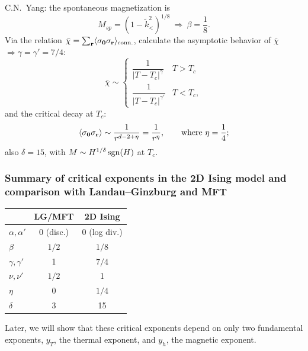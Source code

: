 C.N.~Yang: the spontaneous magnetization is
\begin{equation}
  M_{sp} = (1-\tilde k_<^2)^{1/8}\ \Rightarrow\ \beta = \frac{1}{8} .
\end{equation}
Via the relation $\bar\chi = \sum_{\mathbf r}\langle \sigma_{\mathbf 0}\sigma_{\mathbf r}\rangle_{\text{conn.}}$,
calculate the asymptotic behavior of $\bar\chi$ $\Rightarrow\gamma = \gamma' = 7/4$:
\begin{equation}
  \bar\chi\sim\begin{cases}\dfrac{1}{|T-T_c|^{\gamma}} & T>T_c\\[8pt] \dfrac{1}{|T-T_c|^{\gamma'}} & T<T_c,\end{cases}
\end{equation}
and the critical decay at $T_c$:
\begin{equation}
  \langle \sigma_{\mathbf 0}\sigma_{\mathbf r}\rangle\sim\frac{1}{r^{d-2+\eta}} = \frac{1}{r^\eta},\qquad\text{where }\eta = \frac{1}{4} ;
\end{equation}
also $\delta = 15$, with $M\sim H^{1/\delta}\operatorname{sgn}(H)$ at $T_c$.

\subsubsection*{Summary of critical exponents in the 2D Ising model and comparison with Landau--Ginzburg and MFT}

\begin{center}
\renewcommand{\arraystretch}{1.25}
\begin{tabular}{lcc}
  & LG/MFT & 2D Ising\\ \hline
  $\alpha,\alpha'$ & 0 (disc.) & 0 (log div.)\\
  $\beta$ & $1/2$ & $1/8$\\
  $\gamma,\gamma'$ & 1 & $7/4$\\
  $\nu,\nu'$ & $1/2$ & 1\\
  $\eta$ & 0 & $1/4$\\
  $\delta$ & 3 & 15
\end{tabular}
\end{center}
Later, we will show that these critical exponents depend on only two fundamental exponents, $y_T$, the
thermal exponent, and $y_h$, the magnetic exponent.
